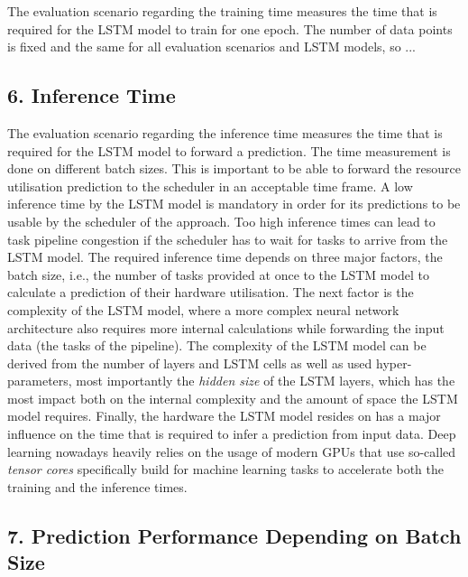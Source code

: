     The evaluation scenario regarding the training time measures the time that is required for the LSTM model to train for one epoch. The number of data points is fixed and the same for all evaluation scenarios and LSTM models, so ...

  \subsection*{6. Inference Time}
  \label{sec:inference-time-evaluation-scenarios}

    The evaluation scenario regarding the inference time measures the time that is required for the LSTM model to forward a prediction.
    The time measurement is done on different batch sizes. This is important to be able to forward the resource utilisation prediction to the scheduler in an acceptable time frame.
    A low inference time by the LSTM model is mandatory in order for its predictions to be usable by the scheduler of the  approach. Too high inference times can lead to task pipeline congestion if the scheduler has to wait for tasks to arrive from the LSTM model.
    The required inference time depends on three major factors, the batch size, i.e., the number of tasks provided at once to the LSTM model to calculate a prediction of their hardware utilisation.
    The next factor is the complexity of the LSTM model, where a more complex neural network architecture also requires more internal calculations while forwarding the input data (the tasks of the pipeline). The complexity of the LSTM model can be derived from the number of layers and LSTM cells as well as used hyper-parameters, most importantly the \emph{hidden size} of the LSTM layers, which has the most impact both on the internal complexity and the amount of space the LSTM model requires.
    Finally, the hardware the LSTM model resides on has a major influence on the time that is required to infer a prediction from input data. Deep learning nowadays heavily relies on the usage of modern GPUs that use so-called \emph{tensor cores} specifically build for machine learning tasks to accelerate both the training and the inference times.


  \subsection*{7. Prediction Performance Depending on Batch Size}
  \label{sec:prediction-performance-depending-on-batch-size-evaluation-scenarios}



